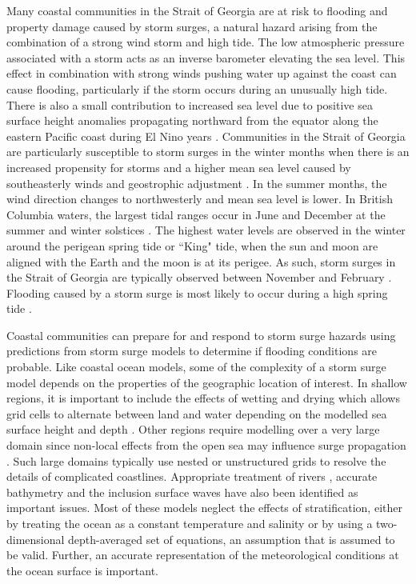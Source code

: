 \documentclass{tATO2e}
\begin{document}
Many coastal communities in the Strait of Georgia are at risk to flooding and property damage caused by storm surges, a natural hazard arising from the combination of a strong wind storm and high tide. The low atmospheric pressure associated with a storm acts as an inverse barometer elevating the sea level. This effect in combination with strong winds pushing water up against the coast can cause flooding, particularly if the storm occurs during an unusually high tide.  There is also a small contribution to increased sea level due to positive sea surface height anomalies propagating northward from the equator along the eastern Pacific coast during El Nino years \citep{strub2002altimeter}. Communities in the Strait of Georgia are particularly susceptible to storm surges in the winter months when there is an increased propensity for storms and a higher mean sea level caused by southeasterly winds and geostrophic adjustment \citep{danard2003storm}. In the summer months, the wind direction changes to northwesterly and mean sea level is lower. In British Columbia waters, the largest tidal ranges occur in June and December at the summer and winter solstices \citep{thomson1981oceanography}. The highest water levels are observed in the winter around the perigean spring tide or ``King" tide, when the sun and moon are aligned with the Earth and the moon is at its perigee. As such, storm surges in the Strait of Georgia are typically observed between November and February \citep{forseth2006adaptation}. Flooding caused by a storm surge is most likely to occur during a high spring tide \citep{abeys2011extreme}. 

Coastal communities can prepare for and respond to storm surge hazards using predictions from storm surge models to determine if flooding conditions are probable. Like coastal ocean models, some of the complexity of a storm surge model depends on the properties of the geographic location of interest. In shallow regions, it is important to include the effects of wetting and drying which allows grid cells to alternate between land and water depending on the modelled sea surface height and depth \citep{hubbert1999storm, weisberg2006hurricane}.  Other regions require modelling over a very large domain since non-local effects from the open sea may influence surge propagation \citep{weisberg2006hurricane, lane2009verification}. Such large domains typically use nested or unstructured grids to resolve the details of complicated coastlines. Appropriate treatment of rivers \citep{flather1994storm}, accurate bathymetry and the inclusion surface waves \citep{xu2010storm} have also been identified as important issues.  Most of these models neglect the effects of stratification, either by treating the ocean as a constant temperature and salinity or by using a two-dimensional depth-averaged set of equations, an assumption that is assumed to be valid. Further, an accurate representation of the meteorological conditions at the ocean surface is important.
\end{document}
